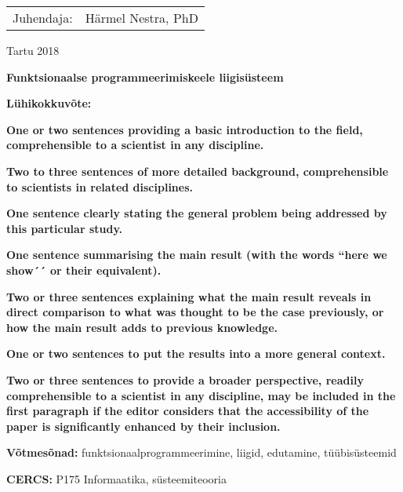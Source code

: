 \documentclass[12pt]{article}
\newcommand\markus[1]{\textcolor{roheline}{\textbf{#1}}}
\begin{document}
  \begin{flushright}
    {
      \setlength{\extrarowheight}{5pt}
      \begin{tabular}{rl} 
        Juhendaja: & Härmel Nestra, PhD
      \end{tabular}}
  \end{flushright}
  \vfill
  \centerline{Tartu 2018}
  \newpage
{
\noindent\textbf{\large Funktsionaalse programmeerimiskeele liigisüsteem}

\vspace*{1ex}

\noindent\textbf{Lühikokkuvõte:} 

\markus{One or two sentences providing a basic introduction to the field, comprehensible to a scientist in
any discipline.}

\markus{Two to three sentences of
more detailed background, comprehensible to scientists in related disciplines.}

\markus{One sentence clearly stating the general problem being addressed by this particular
study.}

\markus{One sentence summarising the main result (with the words ``here we show´´ or their equivalent).}

\markus{Two or three sentences explaining what
the main result reveals in direct
comparison to what was thought to be the case previously, or how the main result adds to previous knowledge.}

\markus{One or two sentences to put the results into a more general context.}

\markus{Two or three sentences to provide a broader perspective, readily comprehensible to a scientist in any discipline, may be included in the first paragraph if the editor considers that the accessibility of the paper is significantly enhanced by their inclusion.}

\vspace*{1ex}

\noindent
\textbf{Võtmesõnad:} funktsionaalprogrammeerimine, liigid, edutamine, tüübisüsteemid

\vspace*{1ex}

\noindent\textbf{CERCS:} P175 Informaatika, süsteemiteooria

\vspace*{1ex}}
\end{document}
